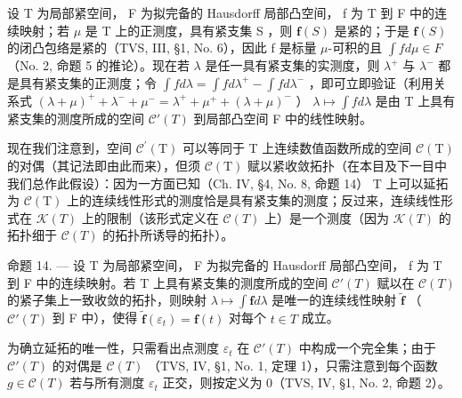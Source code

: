 设 T 为局部紧空间， F 为拟完备的 Hausdorff 局部凸空间， f 为 T 到 F 中的连续映射；若 \(\mu\) 是 T 上的正测度，具有紧支集 S ，则 \(\mathbf{f}(S)\) 是紧的；于是 \(\mathbf{f}(S)\) 的闭凸包络是紧的（TVS, III, §1, No. 6），因此 f 是标量 \(\mu\)-可积的且 \(\int f d\mu \in F\) （No. 2, 命题 5 的推论）。现在若 \(\lambda\) 是任一具有紧支集的实测度，则 \(\lambda^{+}\) 与 \(\lambda^{-}\) 都是具有紧支集的正测度；令 \(\int f d\lambda = \int f d\lambda^{+} - \int f d\lambda^{-}\) ，即可立即验证（利用关系式 \((\lambda + \mu)^{+} + \lambda^{-} + \mu^{-} = \lambda^{+} + \mu^{+} + (\lambda + \mu)^{-}\) ） \(\lambda \mapsto \int f d\lambda\) 是由 T 上具有紧支集的测度所成的空间 \(\mathcal{C}'(T)\) 到局部凸空间 F 中的线性映射。

现在我们注意到，空间 \(\mathcal{C}^{\prime}(\mathrm{T})\) 可以等同于 T 上连续数值函数所成的空间 \(\mathcal{C}(\mathrm{T})\) 的对偶（其记法即由此而来），但须 \(\mathcal{C}(\mathrm{T})\) 赋以紧收敛拓扑（在本目及下一目中我们总作此假设）：因为一方面已知（Ch. IV, §4, No. 8, 命题 14） T 上可以延拓为 \(\mathcal{C}(\mathrm{T})\) 上的连续线性形式的测度恰是具有紧支集的测度；反过来，连续线性形式在 \(\mathcal{K}(T)\) 上的限制（该形式定义在 \(\mathcal{C}(T)\) 上）是一个测度（因为 \(\mathcal{K}(T)\) 的拓扑细于 \(\mathcal{C}(T)\) 的拓扑所诱导的拓扑）。

命题 14. --- 设 T 为局部紧空间， F 为拟完备的 Hausdorff 局部凸空间， f 为 T 到 F 中的连续映射。若 T 上具有紧支集的测度所成的空间 \(\mathcal{C}'(T)\) 赋以在 \(\mathcal{C}(T)\) 的紧子集上一致收敛的拓扑，则映射 \(\lambda \mapsto \int \mathbf{f} d\lambda\) 是唯一的连续线性映射 \(\widetilde{\mathbf{f}}\) （ \(\mathcal{C}'(T)\) 到 F 中），使得 \(\widetilde{\mathbf{f}}(\varepsilon_t) = \mathbf{f}(t)\) 对每个 \(t \in T\) 成立。

为确立延拓的唯一性，只需看出点测度 \(\varepsilon_{t}\) 在 \(\mathcal{C}'(T)\) 中构成一个完全集；由于 \(\mathcal{C}'(T)\) 的对偶是 \(\mathcal{C}(T)\) （TVS, IV, §1, No. 1, 定理 1），只需注意到每个函数 \(g \in \mathcal{C}(T)\) 若与所有测度 \(\varepsilon_{t}\) 正交，则按定义为 0（TVS, IV, §1, No. 2, 命题 2）。

